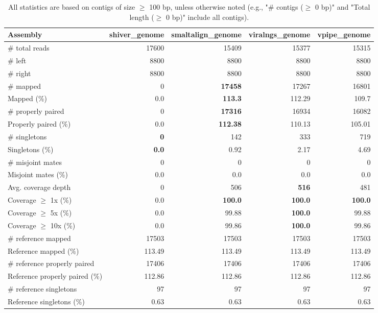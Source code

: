 \documentclass[12pt,a4paper]{article}
\begin{document}
\begin{table}[ht]
\begin{center}
\caption{All statistics are based on contigs of size $\geq$ 100 bp, unless otherwise noted (e.g., "\# contigs ($\geq$ 0 bp)" and "Total length ($\geq$ 0 bp)" include all contigs).}
\begin{tabular}{|l*{4}{|r}|}
\hline
Assembly & shiver\_genome & smaltalign\_genome & viralngs\_genome & vpipe\_genome \\ \hline
\# total reads & 17600 & 15409 & 15377 & 15315 \\ \hline
\# left & 8800 & 8800 & 8800 & 8800 \\ \hline
\# right & 8800 & 8800 & 8800 & 8800 \\ \hline
\# mapped & 0 & {\bf 17458} & 17267 & 16801 \\ \hline
Mapped (\%) & 0.0 & {\bf 113.3} & 112.29 & 109.7 \\ \hline
\# properly paired & 0 & {\bf 17316} & 16934 & 16082 \\ \hline
Properly paired (\%) & 0.0 & {\bf 112.38} & 110.13 & 105.01 \\ \hline
\# singletons & {\bf 0} & 142 & 333 & 719 \\ \hline
Singletons (\%) & {\bf 0.0} & 0.92 & 2.17 & 4.69 \\ \hline
\# misjoint mates & 0 & 0 & 0 & 0 \\ \hline
Misjoint mates (\%) & 0.0 & 0.0 & 0.0 & 0.0 \\ \hline
Avg. coverage depth & 0 & 506 & {\bf 516} & 481 \\ \hline
Coverage $\geq$ 1x (\%) & 0.0 & {\bf 100.0} & {\bf 100.0} & {\bf 100.0} \\ \hline
Coverage $\geq$ 5x (\%) & 0.0 & 99.88 & {\bf 100.0} & 99.88 \\ \hline
Coverage $\geq$ 10x (\%) & 0.0 & 99.86 & {\bf 100.0} & 99.86 \\ \hline
\# reference mapped & 17503 & 17503 & 17503 & 17503 \\ \hline
Reference mapped (\%) & 113.49 & 113.49 & 113.49 & 113.49 \\ \hline
\# reference properly paired & 17406 & 17406 & 17406 & 17406 \\ \hline
Reference properly paired (\%) & 112.86 & 112.86 & 112.86 & 112.86 \\ \hline
\# reference singletons & 97 & 97 & 97 & 97 \\ \hline
Reference singletons (\%) & 0.63 & 0.63 & 0.63 & 0.63 \\ \hline

\end{tabular}
\end{center}
\end{table}
\end{document}
